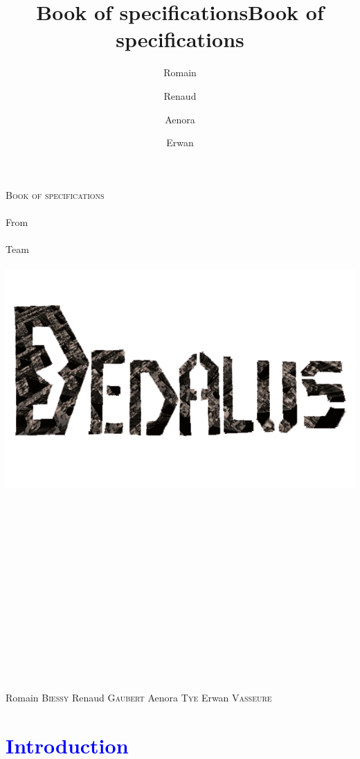 \documentclass[article]{report} %
\title {Book of specifications}
\title {Book of specifications}
\author {Romain\and Renaud\and Aenora\and Erwan}
\date {}
\begin{document}
		\thispagestyle{empty}
  			\begin{titlepage} 
						\vspace*{1cm} 
  					\begin{center} 
  							{\huge{\textsc{Book of specifications} \\ ~ \\{\large From}\\ ~\\ Team \\  ~ \\ }}
	  						\includegraphics[width = 14cm]{Images/Dedalus.png}
							\\ ~ \\ ~ \\ ~ \\ ~ \\ ~ \\ ~ \\ ~ \\ ~ \\ ~ \\ ~ \\ ~ \\ ~ \\ ~ \\ ~ 
						\end{center}
  					\hfill {\large Romain \textsc{Biessy}}
  					\hfill {\large Renaud \textsc{Gaubert}}
  					\hfill {\large Aenora \textsc{Tye}}
  					\hfill {\large Erwan  \textsc{Vasseure}}
  			\end{titlepage} 

  	\tableofcontents
  			\newpage
				\chapter{\textcolor{blue}{Introduction}}
\end{document}
